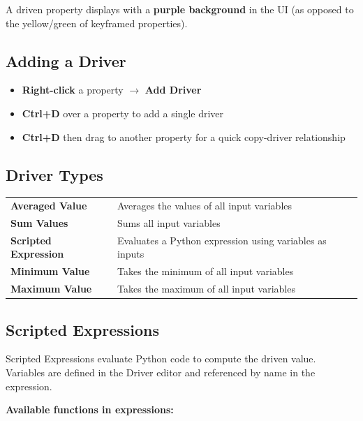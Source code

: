 A driven property displays with a \textbf{purple background} in the UI (as opposed to the yellow/green of keyframed properties).

\subsection{Adding a Driver}

\begin{itemize}[leftmargin=2em]
  \item \textbf{Right-click} a property $\rightarrow$ \textbf{Add Driver}
  \item \textbf{Ctrl+D} over a property to add a single driver
  \item \textbf{Ctrl+D} then drag to another property for a quick copy-driver relationship
\end{itemize}

\subsection{Driver Types}

\begin{center}
\begin{tabularx}{\textwidth}{L{3.5cm}X}
\toprule
{}
 &  \\
\midrule
\textbf{Averaged Value} & Averages the values of all input variables \\
\textbf{Sum Values} & Sums all input variables \\
\textbf{Scripted Expression} & Evaluates a Python expression using variables as inputs \\
\textbf{Minimum Value} & Takes the minimum of all input variables \\
\textbf{Maximum Value} & Takes the maximum of all input variables \\
\bottomrule
\end{tabularx}
\end{center}

\subsection{Scripted Expressions}

Scripted Expressions evaluate Python code to compute the driven value. Variables are defined in the Driver editor and referenced by name in the expression.

\textbf{Available functions in expressions:}

